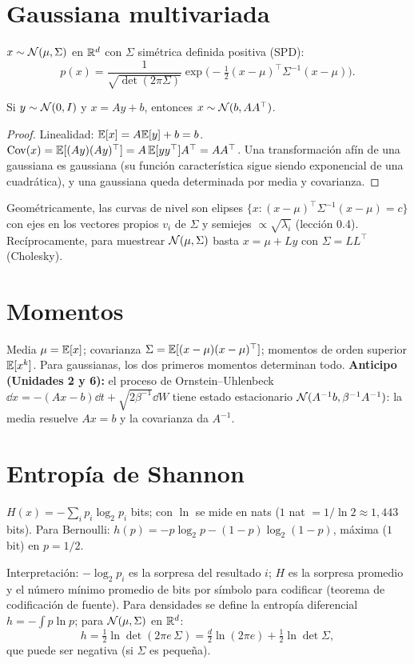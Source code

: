 \documentclass[11pt,a4paper]{article}
\begin{document}
\section{Gaussiana multivariada}
$x\sim\mathcal{N}(\mu,\Sigma)$ en $\mathbb{R}^d$ con $\Sigma$ simétrica definida positiva (SPD):
\[
p(x)=\frac{1}{\sqrt{\det(2\pi\Sigma)}}\exp\!\Big(-\tfrac12(x-\mu)^\top\Sigma^{-1}(x-\mu)\Big).
\]
\begin{proposicion}
Si $y\sim\mathcal{N}(0,I)$ y $x=Ay+b$, entonces $x\sim\mathcal{N}(b,AA^\top)$.
\end{proposicion}
\begin{proof}
Linealidad: $\mathbb{E}[x]=A\mathbb{E}[y]+b=b$. $\mathrm{Cov}(x)=\mathbb{E}[(Ay)(Ay)^\top]=A\,\mathbb{E}[yy^\top]A^\top=AA^\top$. Una
transformación afín de una gaussiana es gaussiana (su función característica sigue siendo exponencial de
una cuadrática), y una gaussiana queda determinada por media y covarianza.
\end{proof}
Geométricamente, las curvas de nivel son elipses $\{x:(x-\mu)^\top\Sigma^{-1}(x-\mu)=c\}$ con ejes en los
vectores propios $v_i$ de $\Sigma$ y semiejes $\propto\sqrt{\lambda_i}$ (lección 0.4). Recíprocamente, para
muestrear $\mathcal{N}(\mu,\Sigma)$ basta $x=\mu+Ly$ con $\Sigma=LL^\top$ (Cholesky).

\section{Momentos}
Media $\mu=\mathbb{E}[x]$; covarianza $\Sigma=\mathbb{E}[(x-\mu)(x-\mu)^\top]$; momentos de orden superior
$\mathbb{E}[x^k]$. Para gaussianas, los dos primeros momentos determinan todo. \textbf{Anticipo (Unidades 2 y 6):}
el proceso de Ornstein--Uhlenbeck $\dd x=-(Ax-b)\dd t+\sqrt{2\beta^{-1}}\dd W$ tiene estado estacionario
$\mathcal{N}(A^{-1}b,\beta^{-1}A^{-1})$: la media resuelve $Ax=b$ y la covarianza da $A^{-1}$.

\section{Entropía de Shannon}
\begin{definicion}[ (entropía)]
$H(x)=-\sum_ip_i\log_2p_i$ bits; con $\ln$ se mide en nats ($1$ nat $=1/\ln2\approx1{,}443$ bits).
Para Bernoulli: $h(p)=-p\log_2p-(1-p)\log_2(1-p)$, máxima ($1$ bit) en $p=1/2$.
\end{definicion}
Interpretación: $-\log_2p_i$ es la sorpresa del resultado $i$; $H$ es la sorpresa promedio y el número
mínimo promedio de bits por símbolo para codificar (teorema de codificación de fuente).
Para densidades se define la entropía diferencial $h=-\int p\ln p$; para $\mathcal{N}(\mu,\Sigma)$ en $\mathbb{R}^d$:
\[h=\tfrac12\ln\det(2\pi e\,\Sigma)=\tfrac d2\ln(2\pi e)+\tfrac12\ln\det\Sigma,\]
que puede ser negativa (si $\Sigma$ es pequeña).
\end{document}
